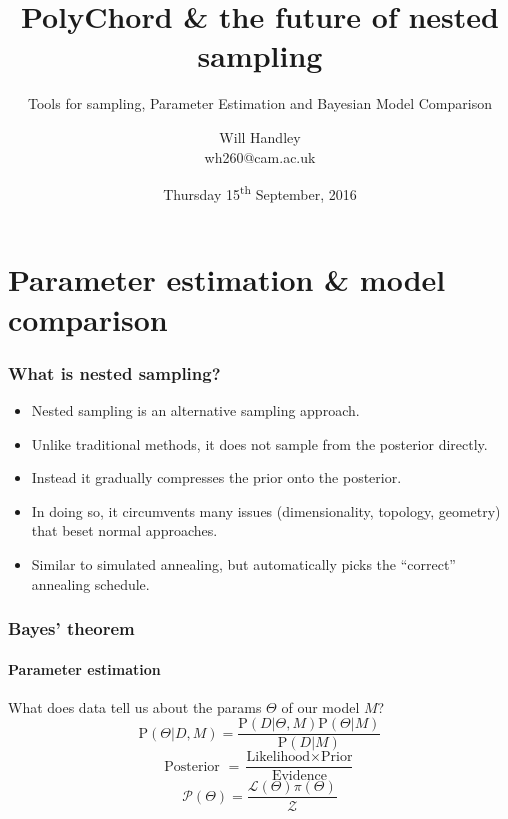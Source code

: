 \documentclass[]{beamer}
\title{PolyChord \& the future of nested sampling}
\subtitle{Tools for sampling, Parameter Estimation and Bayesian Model Comparison}
\author[Handley] %
{Will Handley\\ \small{wh260@cam.ac.uk}}
\institute[University of Cambridge] %
{%
Supervisors: Anthony Lasenby \& Mike Hobson \\
Astrophysics Group \\
Cavendish Laboratory \\
University of Cambridge
}
\date{Thursday 15\textsuperscript{th} September, 2016}
\newcommand{\lik}{\mathcal{L}}
\newcommand{\posterior}{\mathcal{P}}
\newcommand{\prior}{\pi}
\newcommand{\ev}{\mathcal{Z}}
\newcommand{\prob}{\mathrm{P}}
\begin{document}
\begin{frame}
  \titlepage
\end{frame}

\begin{frame}
  \tableofcontents
\end{frame}


\section{Parameter estimation \& model comparison}
%
%
%

\begin{frame}
  \frametitle{What is nested sampling?}
  \begin{itemize}
    \pause\item Nested sampling is an alternative sampling approach. 
    \pause\item Unlike traditional methods, it does not sample from the posterior directly.
    \pause\item Instead it gradually compresses the prior onto the posterior.
    \pause\item In doing so, it circumvents many issues (dimensionality, topology, geometry) that beset normal approaches.
    \pause\item Similar to simulated annealing, but automatically picks the ``correct'' annealing schedule.
  \end{itemize}
\end{frame}

\begin{frame}
  \frametitle{Bayes' theorem}
  \framesubtitle{Parameter estimation}

  \pause
  What does data tell us about the params $\Theta$ of our model $M$?
    \[\prob(\Theta|D,M) = \frac{\prob(D|\Theta,M) \prob(\Theta|M) }{ \prob(D|M) }\] 
    \pause
    \[\text{Posterior } = \frac{\text{Likelihood} \times \text{Prior} } {\text{Evidence} }\] 
    \pause
    \[ \posterior(\Theta)= \frac{\lik(\Theta) \prior(\Theta)} {\ev}\] 

\end{frame}
\end{document}
